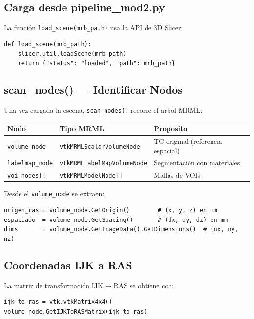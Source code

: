 \documentclass[12pt,a4paper]{article}
\begin{document}
\subsection{Carga desde pipeline\_mod2.py}

La función \texttt{load\_scene(mrb\_path)} usa la API de 3D Slicer:

\begin{lstlisting}
def load_scene(mrb_path):
    slicer.util.loadScene(mrb_path)
    return {"status": "loaded", "path": mrb_path}
\end{lstlisting}

\subsection{scan\_nodes() --- Identificar Nodos}

Una vez cargada la escena, \texttt{scan\_nodes()} recorre el arbol MRML:

\begin{center}
\begin{tabular}{lll}
\toprule
\textbf{Nodo} & \textbf{Tipo MRML} & \textbf{Proposito} \\
\midrule
\texttt{volume\_node} & \texttt{vtkMRMLScalarVolumeNode} & TC original (referencia espacial) \\
\texttt{labelmap\_node} & \texttt{vtkMRMLLabelMapVolumeNode} & Segmentación con materiales \\
\texttt{voi\_nodes[]} & \texttt{vtkMRMLModelNode[]} & Mallas de VOIs \\
\bottomrule
\end{tabular}
\end{center}

Desde el \texttt{volume\_node} se extraen:

\begin{lstlisting}
origen_ras = volume_node.GetOrigin()        # (x, y, z) en mm
espaciado  = volume_node.GetSpacing()       # (dx, dy, dz) en mm
dims       = volume_node.GetImageData().GetDimensions()  # (nx, ny, nz)
\end{lstlisting}

\subsection{Coordenadas IJK a RAS}

La matriz de transformación IJK$\to$RAS se obtiene con:

\begin{lstlisting}
ijk_to_ras = vtk.vtkMatrix4x4()
volume_node.GetIJKToRASMatrix(ijk_to_ras)
\end{lstlisting}
\end{document}
